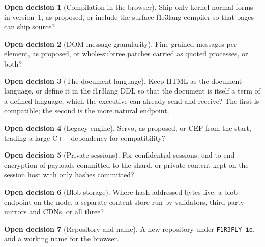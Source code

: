 \documentclass[11pt]{article}
\theoremstyle{definition}
\newtheorem{decision}{Open decision}
\theoremstyle{remark}
\newcommand{\fl}{f1r3lang}
\newcommand{\code}[1]{\texttt{#1}}
\begin{document}
\begin{decision}[Compilation in the browser]\label{dec:compile}
Ship only kernel normal forms in version~1, as proposed, or include the surface
\fl{} compiler so that pages can ship source?
\end{decision}

\begin{decision}[DOM message granularity]\label{dec:granularity}
Fine-grained messages per element, as proposed, or whole-subtree patches carried as
quoted processes, or both?
\end{decision}

\begin{decision}[The document language]
Keep HTML as the document language, or define it in the \fl{} DDL so that the document
is itself a term of a defined language, which the executive can already send and
receive? The first is compatible; the second is the more natural endpoint.
\end{decision}

\begin{decision}[Legacy engine]
Servo, as proposed, or CEF from the start, trading a large C++ dependency for
compatibility?
\end{decision}

\begin{decision}[Private sessions]\label{dec:privacy}
For confidential sessions, end-to-end encryption of payloads committed to the shard, or
private content kept on the session host with only hashes committed?
\end{decision}

\begin{decision}[Blob storage]
Where hash-addressed bytes live: a blob endpoint on the node, a separate content store run
by validators, third-party mirrors and CDNs, or all three?
\end{decision}

\begin{decision}[Repository and name]
A new repository under \code{F1R3FLY-io}, and a working name for the browser.
\end{decision}
\end{document}
